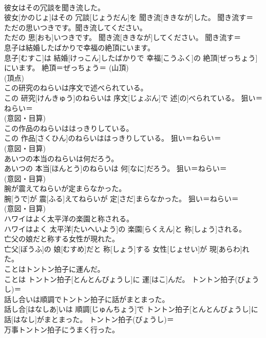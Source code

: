 \documentclass[8pt]{extreport}
\begin{document}
\begin{CJK}{UTF8}{min}
{\\	彼女はその冗談を聞き流した。	
\\	彼女[かのじょ]はその 冗談[じょうだん]を 聞き流[ききなが]した。	聞き流す＝ 
\\	ただの思いつきです。聞き流してください。	
\\	ただの 思[おも]いつきです。 聞き流[ききなが]してください。	聞き流す＝ 
\\	息子は結婚したばかりで幸福の絶頂にいます。	
\\	息子[むすこ]は 結婚[けっこん]したばかりで 幸福[こうふく]の 絶頂[ぜっちょう]にいます。	絶頂＝ぜっちょう＝ (山頂) 
\\	(頂点) 
\\	この研究のねらいは序文で述べられている。	
\\	この 研究[けんきゅう]のねらいは 序文[じょぶん]で 述[の]べられている。	狙い＝ねらい＝ 
\\	(意図・目算) 
\\	この作品のねらいははっきりしている。	
\\	この 作品[さくひん]のねらいははっきりしている。	狙い＝ねらい＝ 
\\	(意図・目算) 
\\	あいつの本当のねらいは何だろう。	
\\	あいつの 本当[ほんとう]のねらいは 何[なに]だろう。	狙い＝ねらい＝ 
\\	(意図・目算) 
\\	腕が震えてねらいが定まらなかった。	
\\	腕[うで]が 震[ふる]えてねらいが 定[さだ]まらなかった。	狙い＝ねらい＝ 
\\	(意図・目算) 
\\	ハワイはよく太平洋の楽園と称される。	
\\	ハワイはよく 太平洋[たいへいよう]の 楽園[らくえん]と 称[しょう]される。	
\\	亡父の娘だと称する女性が現れた。	
\\	亡父[ぼうふ]の 娘[むすめ]だと 称[しょう]する 女性[じょせい]が 現[あらわ]れた。	
\\	ことはトントン拍子に運んだ。	
\\	ことは トントン拍子[とんとんびょうし]に 運[はこ]んだ。	トントン拍子(びょうし)＝ 
\\	話し合いは順調でトントン拍子に話がまとまった。	
\\	話し合[はなしあ]いは 順調[じゅんちょう]で トントン拍子[とんとんびょうし]に 話[はなし]がまとまった。	トントン拍子(びょうし)＝ 
\\	万事トントン拍子にうまく行った。	
}
\end{CJK}
\end{document}
